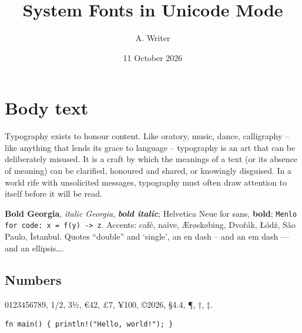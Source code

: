 \documentclass[11pt]{article}
\title{System Fonts in Unicode Mode}
\author{A. Writer}
\date{11 October 2026}
\begin{document}
\maketitle
\section{Body text}
Typography exists to honour content. Like oratory, music, dance, calligraphy -- like anything that lends its grace to language -- typography is an art that can be deliberately misused. It is a craft by which the meanings of a text (or its absence of meaning) can be clarified, honoured and shared, or knowingly disguised. In a world rife with unsolicited messages, typography must often draw attention to itself before it will be read.

\textbf{Bold Georgia}, \textit{italic Georgia}, \textbf{\textit{bold italic}};
\textsf{Helvetica Neue for sans, \textbf{bold}}; \texttt{Menlo for code: x = f(y) -> z}.
Accents: café, naïve, Ærøskøbing, Dvořák, Łódź, São Paulo, İstanbul. Quotes “double” and ‘single’,
an en dash -- and an em dash --- and an ellipsis….
\subsection{Numbers}
0123456789, 1/2, 3½, €42, £7, ¥100, ©2026, §4.4, ¶, †, ‡.
\begin{verbatim}
fn main() { println!("Hello, world!"); }
\end{verbatim}
\end{document}
